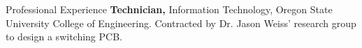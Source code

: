 \begin{rubric}{Professional Experience}
\entry*[2018 -- 2023]%
  \textbf{Technician,} Information Technology, Oregon State University College of Engineering.
\entry*[2022] Contracted by Dr. Jason Weiss' research group to design a switching PCB.
\end{rubric}
